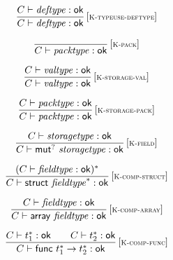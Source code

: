 $$
\begin{array}{@{}c@{}}\displaystyle
\frac{
C \vdash {\mathit{deftype}} : \mathsf{ok}
}{
C \vdash {\mathit{deftype}} : \mathsf{ok}
} \, {[\textsc{\scriptsize K{-}typeuse{-}deftype}]}
\qquad
\end{array}
$$

\vspace{1ex}

$$
\begin{array}{@{}c@{}}\displaystyle
\frac{
}{
C \vdash {\mathit{packtype}} : \mathsf{ok}
} \, {[\textsc{\scriptsize K{-}pack}]}
\qquad
\end{array}
$$

$$
\begin{array}{@{}c@{}}\displaystyle
\frac{
C \vdash {\mathit{valtype}} : \mathsf{ok}
}{
C \vdash {\mathit{valtype}} : \mathsf{ok}
} \, {[\textsc{\scriptsize K{-}storage{-}val}]}
\qquad
\end{array}
$$

$$
\begin{array}{@{}c@{}}\displaystyle
\frac{
C \vdash {\mathit{packtype}} : \mathsf{ok}
}{
C \vdash {\mathit{packtype}} : \mathsf{ok}
} \, {[\textsc{\scriptsize K{-}storage{-}pack}]}
\qquad
\end{array}
$$

$$
\begin{array}{@{}c@{}}\displaystyle
\frac{
C \vdash {\mathit{storagetype}} : \mathsf{ok}
}{
C \vdash {\mathsf{mut}^?}~{\mathit{storagetype}} : \mathsf{ok}
} \, {[\textsc{\scriptsize K{-}field}]}
\qquad
\end{array}
$$

\vspace{1ex}

$$
\begin{array}{@{}c@{}}\displaystyle
\frac{
(C \vdash {\mathit{fieldtype}} : \mathsf{ok})^\ast
}{
C \vdash \mathsf{struct}~{{\mathit{fieldtype}}^\ast} : \mathsf{ok}
} \, {[\textsc{\scriptsize K{-}comp{-}struct}]}
\qquad
\end{array}
$$

$$
\begin{array}{@{}c@{}}\displaystyle
\frac{
C \vdash {\mathit{fieldtype}} : \mathsf{ok}
}{
C \vdash \mathsf{array}~{\mathit{fieldtype}} : \mathsf{ok}
} \, {[\textsc{\scriptsize K{-}comp{-}array}]}
\qquad
\end{array}
$$

$$
\begin{array}{@{}c@{}}\displaystyle
\frac{
C \vdash {t_1^\ast} : \mathsf{ok}
 \qquad
C \vdash {t_2^\ast} : \mathsf{ok}
}{
C \vdash \mathsf{func}~{t_1^\ast} \rightarrow {t_2^\ast} : \mathsf{ok}
} \, {[\textsc{\scriptsize K{-}comp{-}func}]}
\qquad
\end{array}
$$

